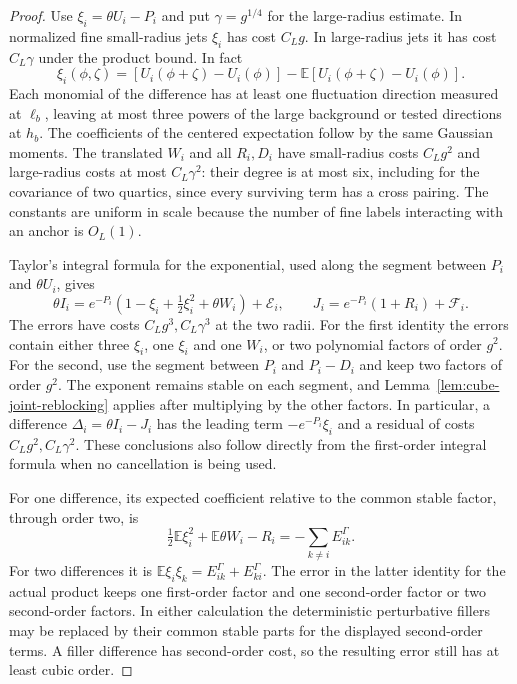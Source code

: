 \documentclass[11pt]{article}
\theoremstyle{definition}
\newcommand{\E}{\mathbb E}
\begin{document}
\begin{proof}
Use \(\xi_i=\theta U_i-P_i\) and put \(\gamma=g^{1/4}\) for
the large-radius estimate. In normalized fine small-radius jets
\(\xi_i\) has cost \(C_Lg\). In large-radius jets it has cost
\(C_L\gamma\) under the product bound. In fact
\begin{equation}
 \xi_i(\phi,\zeta)=
 [U_i(\phi+\zeta)-U_i(\phi)]
      -\E[U_i(\phi+\zeta)-U_i(\phi)].
\end{equation}
Each monomial of the difference has at least one fluctuation
direction measured at \(\ell_b\), leaving at most three powers
of the large background or tested directions at \(h_b\).
The coefficients of the centered expectation follow by the
same Gaussian moments. The translated \(W_i\) and all
\(R_i,D_i\) have small-radius costs \(C_Lg^2\) and
large-radius costs at most \(C_L\gamma^2\): their degree is
at most six, including for the covariance of two quartics,
since every surviving term has a cross pairing. The constants
are uniform in scale because the number of fine labels
interacting with an anchor is \(O_L(1)\).

Taylor's integral formula for the exponential, used along the
segment between \(P_i\) and \(\theta U_i\), gives
\begin{equation}
 \theta I_i=e^{-P_i}(1-\xi_i+\tfrac12\xi_i^2+\theta W_i)
                 +\mathcal E_i,
 \qquad J_i=e^{-P_i}(1+R_i)+\mathcal F_i.
\end{equation}
The errors have costs \(C_L g^3,C_L\gamma^3\) at the two
radii. For the first identity the errors contain either three
\(\xi_i\), one \(\xi_i\) and one \(W_i\), or two polynomial
factors of order \(g^2\). For the second, use the segment
between \(P_i\) and \(P_i-D_i\) and keep two factors of order
\(g^2\). The exponent remains stable on each segment, and
Lemma~\ref{lem:cube-joint-reblocking} applies after multiplying
by the other factors. In particular, a difference
\(\Delta_i=\theta I_i-J_i\) has the leading term
\(-e^{-P_i}\xi_i\) and a residual of costs \(C_Lg^2,C_L\gamma^2\).
These conclusions also follow directly from the first-order
integral formula when no cancellation is being used.

For one difference, its expected coefficient relative to the
common stable factor, through order two, is
\begin{equation}
 \tfrac12\E\xi_i^2+\E\theta W_i-R_i
    =-\sum_{k\ne i} E^\Gamma_{ik}.
\end{equation}
For two differences it is \(\E\xi_i\xi_k
=E^\Gamma_{ik}+E^\Gamma_{ki}\). The error in the latter identity
for the actual product keeps one first-order factor and one
second-order factor or two second-order factors. In either
calculation the deterministic perturbative fillers may be
replaced by their common stable parts for the displayed
second-order terms. A filler difference has second-order cost,
so the resulting error still has at least cubic order.


\end{proof}
\end{document}
